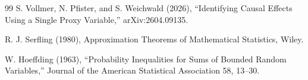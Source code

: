 \documentclass{article}
\begin{document}
\begin{thebibliography}{99}
   S. Vollmer, N. Pfister, and S. Weichwald (2026), ``Identifying Causal Effects Using a Single Proxy Variable,'' arXiv:2604.09135.

   R. J. Serfling (1980), Approximation Theorems of Mathematical Statistics, Wiley.

   W. Hoeffding (1963), ``Probability Inequalities for Sums of Bounded Random Variables,'' Journal of the American Statistical Association 58, 13--30.

\end{thebibliography}
\end{document}
